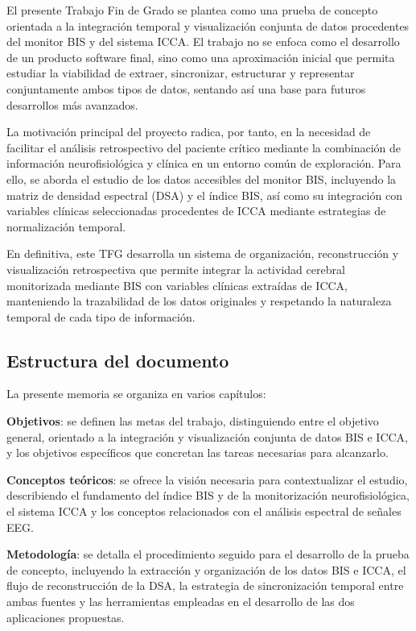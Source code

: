 \documentclass[
  spanish,
  a4paper,
  12pt,
  twoside]{memoir}
\begin{document}
El presente Trabajo Fin de Grado se plantea como una prueba de concepto
orientada a la integración temporal y visualización conjunta de datos
procedentes del monitor BIS y del sistema ICCA. El trabajo no se enfoca
como el desarrollo de un producto software final, sino como una
aproximación inicial que permita estudiar la viabilidad de extraer,
sincronizar, estructurar y representar conjuntamente ambos tipos de
datos, sentando así una base para futuros desarrollos más avanzados.

La motivación principal del proyecto radica, por tanto, en la necesidad
de facilitar el análisis retrospectivo del paciente crítico mediante la
combinación de información neurofisiológica y clínica en un entorno
común de exploración. Para ello, se aborda el estudio de los datos
accesibles del monitor BIS, incluyendo la matriz de densidad espectral
(DSA) y el índice BIS, así como su integración con variables clínicas
seleccionadas procedentes de ICCA mediante estrategias de normalización
temporal.

En definitiva, este TFG desarrolla un sistema de organización,
reconstrucción y visualización retrospectiva que permite integrar la
actividad cerebral monitorizada mediante BIS con variables clínicas
extraídas de ICCA, manteniendo la trazabilidad de los datos originales y
respetando la naturaleza temporal de cada tipo de información.

\subsection{Estructura del documento}\label{estructura-del-documento}

La presente memoria se organiza en varios capítulos:

\textbf{Objetivos}: se definen las metas del trabajo, distinguiendo
entre el objetivo general, orientado a la integración y visualización
conjunta de datos BIS e ICCA, y los objetivos específicos que concretan
las tareas necesarias para alcanzarlo.

\textbf{Conceptos teóricos}: se ofrece la visión necesaria para
contextualizar el estudio, describiendo el fundamento del índice BIS y
de la monitorización neurofisiológica, el sistema ICCA y los conceptos
relacionados con el análisis espectral de señales EEG.

\textbf{Metodología}: se detalla el procedimiento seguido para el
desarrollo de la prueba de concepto, incluyendo la extracción y
organización de los datos BIS e ICCA, el flujo de reconstrucción de la
DSA, la estrategia de sincronización temporal entre ambas fuentes y las
herramientas empleadas en el desarrollo de las dos aplicaciones
propuestas.
\end{document}
